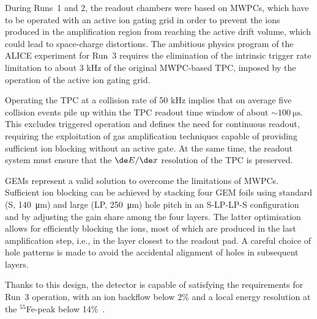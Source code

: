 During Runs~1 and 2, the readout chambers were based on MWPCs, which have to be operated with an active ion gating grid in order to prevent the ions produced in the amplification region from reaching the active drift volume, which could lead to space-charge distortions. The ambitious physics program of the ALICE experiment for Run~3 requires the elimination of the intrinsic trigger rate limitation to about 3 kHz of the original MWPC-based TPC, imposed by the operation of the active ion gating grid.

Operating the TPC at a collision rate of 50 kHz implies that on average five collision events pile up within the TPC readout time window of about $\sim\SI{100}{\micro\second}$. This excludes triggered operation and defines the need for continuous readout, requiring the exploitation of gas amplification techniques capable of providing sufficient ion blocking without an active gate. At the same time, the readout system must ensure that the $\de E/\de x$ resolution of the TPC is preserved.

GEMs represent a valid solution to overcome the limitations of MWPCs. Sufficient ion blocking can be achieved by stacking four GEM foils using standard (S, \SI{140}{\micro\meter}) and large (LP, \SI{250}{\micro\meter}) hole pitch in an S-LP-LP-S configuration and by adjusting the gain share among the four layers. The latter optimisation allows for efficiently blocking the ions, most of which are produced in the last amplification step, i.e., in the layer closest to the readout pad. A careful choice of hole patterns is made to avoid the accidental alignment of holes in subsequent layers. 

Thanks to this design, the detector is capable of satisfying the requirements for Run~3 operation, with an ion backflow below 2\% and a local energy resolution at the $^{55}$Fe-peak below 14\%~\cite{ALICETPC:2020ann}.

